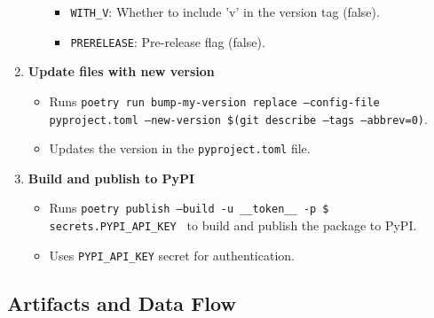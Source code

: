 \begin{enumerate}
\begin{itemize}
\begin{itemize}
            \item \texttt{WITH\_V}: Whether to include 'v' in the version tag (false).
            \item \texttt{PRERELEASE}: Pre-release flag (false).
        \end{itemize}
    \end{itemize}
    \item \textbf{Update files with new version}
    \begin{itemize}
        \item Runs \texttt{poetry run bump-my-version replace --config-file pyproject.toml --new-version \$(git describe --tags --abbrev=0)}.
        \item Updates the version in the \texttt{pyproject.toml} file.
    \end{itemize}
    \item \textbf{Build and publish to PyPI}
    \begin{itemize}
        \item Runs \texttt{poetry publish --build -u \_\_token\_\_ -p \${{ secrets.PYPI\_API\_KEY }}} to build and publish the package to PyPI.
        \item Uses \texttt{PYPI\_API\_KEY} secret for authentication.
    \end{itemize}
\end{enumerate}


\subsection{Artifacts and Data Flow}

